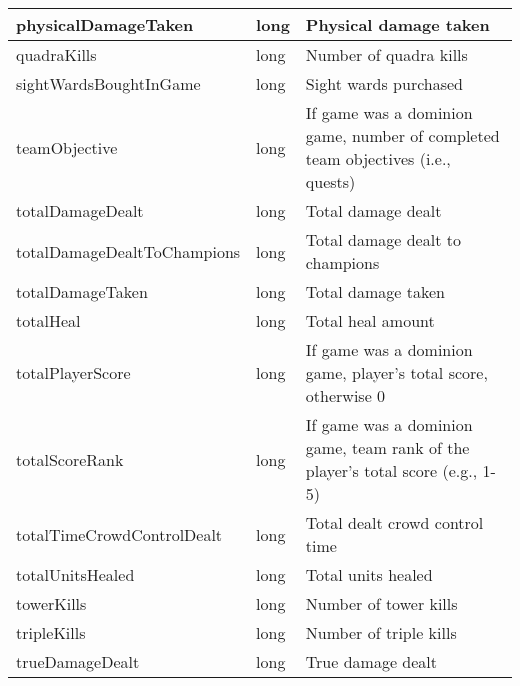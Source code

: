 \begin{table}[!h]
\begin{tabular}{llp{5cm}}
physicalDamageTaken             & long               & Physical damage taken                                                           \\ \hline
quadraKills                     & long               & Number of quadra kills                                                          \\ \hline
sightWardsBoughtInGame          & long               & Sight wards purchased                                                           \\ \hline
teamObjective                   & long               & If game was a dominion game, number of completed team objectives (i.e., quests) \\ \hline
totalDamageDealt                & long               & Total damage dealt                                                              \\ \hline
totalDamageDealtToChampions     & long               & Total damage dealt to champions                                                 \\ \hline
totalDamageTaken                & long               & Total damage taken                                                              \\ \hline
totalHeal                       & long               & Total heal amount                                                               \\ \hline
totalPlayerScore                & long               & If game was a dominion game, player's total score, otherwise 0                  \\ \hline
totalScoreRank                  & long               & If game was a dominion game, team rank of the player's total score (e.g., 1-5)  \\ \hline
totalTimeCrowdControlDealt      & long               & Total dealt crowd control time                                                  \\ \hline
totalUnitsHealed                & long               & Total units healed                                                              \\ \hline
towerKills                      & long               & Number of tower kills                                                           \\ \hline
tripleKills                     & long               & Number of triple kills                                                          \\ \hline
trueDamageDealt                 & long               & True damage dealt                                                               \\ \hline

\end{tabular}
\end{table}
